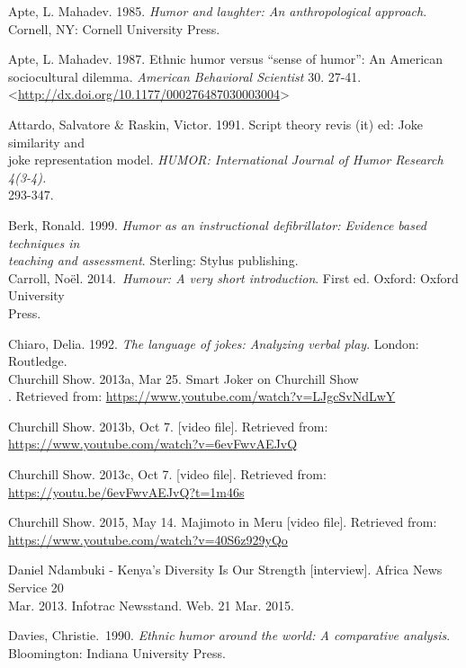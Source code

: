 \documentclass[output=paper]{langsci/langscibook}
\begin{document}
Apte, L. Mahadev. 1985. \textit{Humor and laughter: An anthropological approach}. Cornell, NY: Cornell University Press.

Apte, L. Mahadev. 1987. Ethnic humor versus “sense of humor”: An American sociocultural dilemma. \textit{American Behavioral Scientist} 30. 27-41. {\textless}\url{http://dx.doi.org/10.1177/000276487030003004}{\textgreater}

Attardo, Salvatore \& Raskin, Victor. 1991. Script theory revis (it) ed: Joke similarity and \\
   joke representation model. \textit{HUMOR: International Journal of Humor Research 4(3-4). \\
   }293-347.

Berk, Ronald. 1999. \textit{Humor as an instructional defibrillator: Evidence based techniques in \\
   }\textit{teaching and assessment}. Sterling: Stylus publishing. \\
Carroll, Noël. 2014.~\textit{Humour: A very short introduction}. First ed. Oxford: Oxford University \\
   Press.

Chiaro, Delia. 1992. \textit{The language of jokes: Analyzing verbal play}. London: Routledge.\\

Churchill Show. 2013a, Mar 25. Smart Joker on Churchill Show\\
   [video file]. Retrieved from: \url{https://www.youtube.com/watch?v=LJgcSvNdLwY}

Churchill Show. 2013b, Oct 7.    [video file]. Retrieved from: \url{https://www.youtube.com/watch?v=6evFwvAEJvQ}

Churchill Show. 2013c, Oct 7.    [video file]. Retrieved from: \url{https://youtu.be/6evFwvAEJvQ?t=1m46s}

Churchill Show. 2015, May 14. Majimoto in Meru [video file]. Retrieved from: \\
   \url{https://www.youtube.com/watch?v=40S6z929yQo}

{\textquotedbl}Daniel Ndambuki - Kenya's Diversity Is Our Strength [interview].{\textquotedbl} Africa News Service 20 \\
   Mar. 2013. Infotrac Newsstand. Web. 21 Mar. 2015. 

Davies, Christie.~1990. \textit{Ethnic humor around the world: A comparative analysis}. Bloomington: Indiana University Press.
\end{document}
